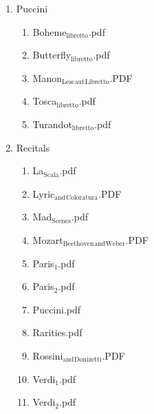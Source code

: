 \documentclass[11pt]{article}
\begin{document}
\begin{enumerate}
\begin{enumerate}
\item Puccini
\label{sec-1-1-1-1-31-9-1-8}
\begin{enumerate}
\item Boheme$_{\text{libretto}}$.pdf
\label{sec-1-1-1-1-31-9-1-8-1}

\item Butterfly$_{\text{libretto}}$.pdf
\label{sec-1-1-1-1-31-9-1-8-2}

\item Manon$_{\text{Lescaut}}$$_{\text{Libretto}}$.PDF
\label{sec-1-1-1-1-31-9-1-8-3}

\item Tosca$_{\text{libretto}}$.pdf
\label{sec-1-1-1-1-31-9-1-8-4}

\item Turandot$_{\text{libretto}}$.pdf
\label{sec-1-1-1-1-31-9-1-8-5}
\end{enumerate}

\item Recitals
\label{sec-1-1-1-1-31-9-1-9}
\begin{enumerate}
\item La$_{\text{Scala}}$.pdf
\label{sec-1-1-1-1-31-9-1-9-1}

\item Lyric$_{\text{and}}$$_{\text{Coloratura}}$.PDF
\label{sec-1-1-1-1-31-9-1-9-2}

\item Mad$_{\text{Scenes}}$.pdf
\label{sec-1-1-1-1-31-9-1-9-3}

\item Mozart$_{\text{Beethoven}}$$_{\text{and}}$$_{\text{Weber}}$.PDF
\label{sec-1-1-1-1-31-9-1-9-4}

\item Paris$_{\text{1}}$.pdf
\label{sec-1-1-1-1-31-9-1-9-5}

\item Paris$_{\text{2}}$.pdf
\label{sec-1-1-1-1-31-9-1-9-6}

\item Puccini.pdf
\label{sec-1-1-1-1-31-9-1-9-7}

\item Rarities.pdf
\label{sec-1-1-1-1-31-9-1-9-8}

\item Rossini$_{\text{and}}$$_{\text{Donizetti}}$.PDF
\label{sec-1-1-1-1-31-9-1-9-9}

\item Verdi$_{\text{1}}$.pdf
\label{sec-1-1-1-1-31-9-1-9-10}

\item Verdi$_{\text{2}}$.pdf
\label{sec-1-1-1-1-31-9-1-9-11}


\end{enumerate}
\end{enumerate}
\end{enumerate}
\end{document}
